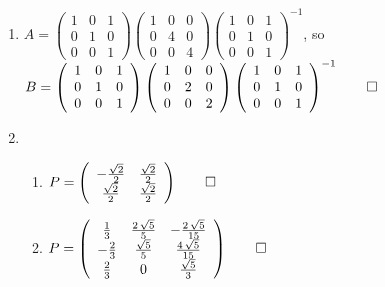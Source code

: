 \documentclass[12pt, a4paper]{article}
\begin{document}
\begin{enumerate}[Q\arabic*.]
  \item $A =  \left(\begin{array}{ccc} 1 & 0 & 1\\ 0 & 1 & 0\\ 0 & 0 & 1 \end{array}\right) \left(\begin{array}{ccc} 1 & 0 & 0\\ 0 & 4 & 0\\ 0 & 0 & 4 \end{array}\right) \left(\begin{array}{ccc} 1 & 0 & 1\\ 0 & 1 & 0\\ 0 & 0 & 1 \end{array}\right)^{-1}$, so $B = \left(\begin{array}{ccc} 1 & 0 & 1\\ 0 & 1 & 0\\ 0 & 0 & 1 \end{array}\right) \left(\begin{array}{ccc} 1 & 0 & 0\\ 0 & 2 & 0\\ 0 & 0 & 2 \end{array}\right) \left(\begin{array}{ccc} 1 & 0 & 1\\ 0 & 1 & 0\\ 0 & 0 & 1 \end{array}\right)^{-1} \qed$
  \pagebreak

  \item 
    \begin{enumerate}[(\alph*)]
      \item $P = \left(\begin{array}{cc} -\frac{\sqrt{2}}{2} & \frac{\sqrt{2}}{2}\\ \frac{\sqrt{2}}{2} & \frac{\sqrt{2}}{2} \end{array}\right) \qed$

      \item $P = \left(\begin{array}{ccc} \frac{1}{3} & \frac{2\,\sqrt{5}}{5} & -\frac{2\,\sqrt{5}}{15}\\ -\frac{2}{3} & \frac{\sqrt{5}}{5} & \frac{4\,\sqrt{5}}{15}\\ \frac{2}{3} & 0 & \frac{\sqrt{5}}{3} \end{array}\right) \qed$
    \end{enumerate}


\end{enumerate}
\end{document}
